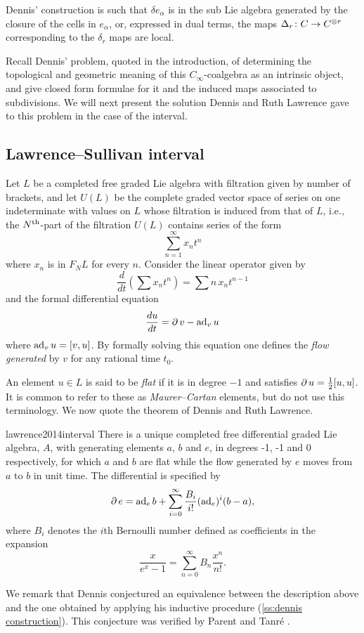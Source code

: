 Dennis' construction is such that $\delta e_\alpha$ is in the sub Lie algebra generated by the closure of the cells in $e_\alpha$, or, expressed in dual terms, the maps $\operatorname{\Delta}_r \colon C \to C^{\otimes r}$ corresponding to the $\delta_r$ maps are local.

Recall Dennis' problem, quoted in the introduction, of determining the topological and geometric meaning of this $C_\infty$-coalgebra as an intrinsic object, and give closed form formulae for it and the induced maps associated to subdivisions.
We will next present the solution Dennis and Ruth Lawrence gave to this problem in the case of the interval.

\subsection{Lawrence--Sullivan interval} \label{ss:LS interval}

Let $L$ be a completed free graded Lie algebra with filtration given by number of brackets, and let $U(L)$ be the complete graded vector space of series on one indeterminate with values on $L$ whose filtration is induced from that of $L$, i.e., the $N^{\mathrm{th}}$-part of the filtration $U(L)$ contains series of the form
\[
\sum_{n=1}^\infty x_n t^n
\]
where $x_n$ is in $F_N L$ for every $n$.
Consider the linear operator given by
\[
\frac{d}{dt} \left(\sum x_n t^n\right) = \sum n \, x_n t^{n-1}
\]
and the formal differential equation
\[
\frac{du}{dt} = \operatorname{\partial} v - \operatorname{ad}_v u
\]
where $\operatorname{ad}_v u = [v, u]$.
By formally solving this equation one defines the \textit{flow generated} by $v$ for any rational time $t_0$.

An element $u \in L$ is said to be \textit{flat} if it is in degree $-1$ and satisfies $\operatorname{\partial} u = \frac{1}{2} [u,u]$.
It is common to refer to these as \textit{Maurer--Cartan} elements, but do not use this terminology.
We now quote the theorem of Dennis and Ruth Lawrence.
\begin{displaycquote}[Theorem 1]{lawrence2014interval}
	There is a unique completed free differential graded Lie algebra, $A$, with generating elements $a$, $b$ and $e$, in degrees -1, -1 and 0 respectively, for which $a$ and $b$ are flat while the flow generated by $e$ moves from $a$ to $b$ in unit time.
	The differential is specified by
	\[
	\operatorname{\partial} e = \operatorname{ad}_e b + \sum_{i=0}^{\infty} \frac{B_i}{i!}(\operatorname{ad}_e)^i(b-a),
	\]
	where $B_i$ denotes the $i$th Bernoulli number defined as coefficients in the expansion
	\[
	\frac{x}{e^x-1} = \sum_{n=0}^{\infty} B_n \frac{x^n}{n!}.
	\]
\end{displaycquote}
We remark that Dennis conjectured an equivalence between the description above and the one obtained by applying his inductive procedure (\cref{ss:dennis construction}).
This conjecture was verified by Parent and Tanr\'{e} \cite{parent2012interval}.

